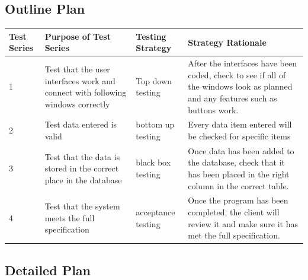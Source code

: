 \begin{landscape}
\subsection{Outline Plan}

\begin{center}
    \begin{tabular}{|p{2cm}|p{5cm}|p{5cm}|p{4cm}|}
        \hline
        \textbf{Test Series} & \textbf{Purpose of Test Series} & \textbf{Testing Strategy} & \textbf{Strategy Rationale}\\ \hline
        1 & Test that the user interfaces work and connect with following windows correctly & Top down testing & After the interfaces have been coded, check to see if all of the windows look as planned and any features such as buttons work. \\ \hline
        2 & Test data entered is valid & bottom up testing & Every data item entered will be checked for specific items \\ \hline
        3 & Test that the data is stored in the correct place in the database & black box testing & Once data has been added to the database, check that it has been placed in the right column in the correct table.\\ \hline
        4 & Test that the system meets the full specification & acceptance testing & Once the program has been completed, the client will review it and make sure it has met the full specification.\\ \hline
    \end{tabular}
\end{center}

\subsection{Detailed Plan}


\end{landscape}

